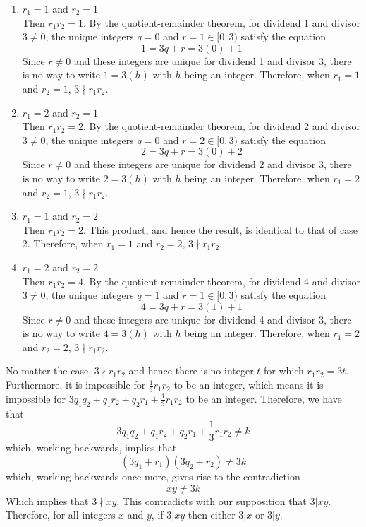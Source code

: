 \documentclass[11pt, letterpaper]{article}
\begin{document}
\begin{prf}[by contradiction]
\begin{enumerate}
        \item $r_{1}=1$ and $r_{2}=1$\\
            Then $r_{1}r_{2}=1$. By the quotient-remainder theorem, for dividend 1 and divisor $3\neq 0$, 
            the unique integers $q=0$ and $r=1\in[0, 3)$ satisfy the equation
            $$1=3q+r=3(0)+1$$
            Since $r\neq 0$ and these integers are unique for  dividend 1 and divisor
            3, there is no way to write $1=3(h)$ with $h$ being an integer. Therefore, when $r_{1}=1$ and $r_{2}=1$, $3\nmid r_{1}r_{2}$.
        \item $r_{1}=2$ and $r_{2}=1$\\
            Then $r_{1}r_{2}=2$. By the quotient-remainder theorem, for dividend 2 and divisor $3\neq 0$, 
            the unique integers $q=0$ and $r=2\in[0, 3)$ satisfy the equation
            $$2=3q+r=3(0)+2$$
            Since $r\neq 0$ and these integers are unique for  dividend 2 and divisor
            3, there is no way to write $2=3(h)$ with $h$ being an integer. Therefore, when $r_{1}=2$ and $r_{2}=1$, $3\nmid r_{1}r_{2}$.
        \item $r_{1}=1$ and $r_{2}=2$\\
            Then $r_{1}r_{2}=2$. This product, and hence the result, is identical to that of case 2. Therefore, when $r_{1}=1$ and $r_{2}=2$, 
            $3\nmid r_{1}r_{2}$.
        \item $r_{1}=2$ and $r_{2}=2$\\
            Then $r_{1}r_{2}=4$. By the quotient-remainder theorem, for dividend 4 and divisor $3\neq 0$, 
            the unique integers $q=1$ and $r=1\in[0, 3)$ satisfy the equation
            $$4=3q+r=3(1)+1$$
            Since $r\neq 0$ and these integers are unique for  dividend 4 and divisor
            3, there is no way to write $4=3(h)$ with $h$ being an integer. Therefore, when $r_{1}=2$ and $r_{2}=2$, $3\nmid r_{1}r_{2}$.      
    \end{enumerate}
    No matter the case, $3\nmid r_{1}r_{2}$ and hence there is no integer $t$ for which $r_{1}r_{2}=3t$. Furthermore, it is impossible for
    $\frac{1}{3}r_{1}r_{2}$ to be an integer, which means it is impossible for $3q_{1}q_{2}+q_{1}r_{2}+q_{2}r_{1}+\frac{1}{3}r_{1}r_{2}$ to be an integer. 
    Therefore, we have that 
    \[3q_{1}q_{2}+q_{1}r_{2}+q_{2}r_{1}+\frac{1}{3}r_{1}r_{2}\neq k\]
    which, working backwards, implies that
    \[(3q_{1}+r_{1})(3q_{2}+r_{2})\neq 3k\]
    which, working backwards once more, gives rise to the contradiction
    \[xy\neq 3k\]
    Which implies that $3\nmid xy$. This contradicts with our supposition that $3|xy$. Therefore, for all integers $x$ and $y$, if $3|xy$ then
    either $3|x$ or $3|y$. 
\end{prf}
\end{document}
